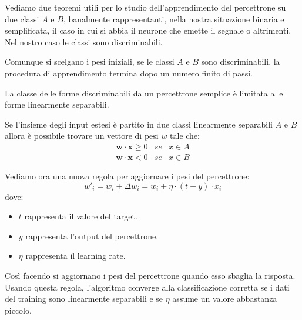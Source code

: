 Vediamo due teoremi utili per lo studio dell'apprendimento del percettrone su due
classi $A$ e $B$, banalmente rappresentanti, nella nostra situazione binaria e
semplificata, il caso in cui si abbia il neurone che emette il segnale o altrimenti.
Nel nostro caso le classi sono discriminabili.
\begin{teorema}
    Comunque si scelgano i pesi iniziali, se le classi $A$ e $B$ sono discriminabili,
    la procedura di apprendimento termina dopo un numero finito di passi.
\end{teorema}
\begin{teorema}
    La classe delle forme discriminabili da un percettrone semplice è limitata
    alle forme linearmente separabili.
\end{teorema}

\begin{teorema}
    Se l'insieme degli input estesi è partito in due classi linearmente separabili
    $A$ e $B$ allora è possibile trovare un vettore di pesi $w$ tale che:
    \begin{equation}
        \begin{array}{ccc}
            \textbf{w} \cdot \textbf{x} \geq 0 & se & x \in A \\
            \textbf{w} \cdot \textbf{x} < 0    & se & x \in B
        \end{array}
    \end{equation}
\end{teorema}

Vediamo ora una nuova regola per aggiornare i pesi del percettrone:
\begin{equation}
    w'_i = w_i + \Delta w_i = w_i + \eta \cdot (t - y) \cdot x_i
\end{equation}
dove: \begin{itemize}
    \item $t$ rappresenta il valore del target.
    \item $y$ rappresenta l'output del percettrone.
    \item $\eta$ rappresenta il learning rate.
\end{itemize}

Così facendo si aggiornano i pesi del percettrone quando esso sbaglia la risposta.
Usando questa regola, l'algoritmo converge alla classificazione corretta se i
dati del training sono linearmente separabili e se $\eta$ assume un valore abbastanza piccolo.
